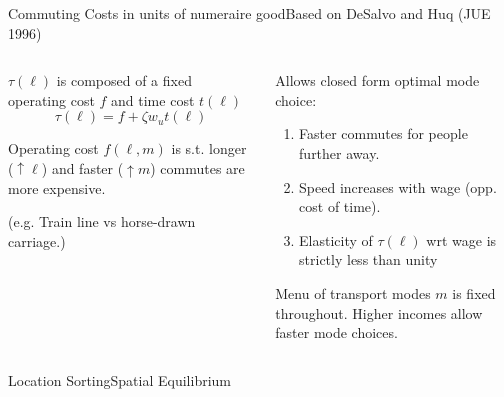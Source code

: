 \documentclass[aspectratio=169]{beamer}
\begin{document}
\begin{v75mins}
\begin{frame}{Commuting Costs in units of numeraire good}{Based on DeSalvo and Huq (JUE 1996)}

\begin{columns}
\begin{column}{0.5\textwidth}
\begin{midi}
\item $\tau(\ell)$ is composed of a fixed operating cost $f$ and time cost $t(\ell)$
\begin{equation*}
\tau(\ell) = f + \zeta w_u t(\ell)
\end{equation*}
\item Operating cost $f(\ell,m)$ is s.t. longer ($\uparrow \ell$) and faster ($\uparrow m$) commutes are more expensive.
\item (e.g. Train line vs horse-drawn carriage.)
\end{midi}
\end{column}
\pause
\begin{column}{0.5\textwidth}
\begin{midi}
\item Allows closed form optimal mode choice:
\begin{enumerate}
\item Faster commutes for people further away.
\item Speed increases with wage (opp. cost of time).
\item Elasticity of $\tau(\ell)$ wrt wage is strictly less than unity%
\end{enumerate}
\item Menu of transport modes $m$ is fixed throughout. Higher incomes allow faster mode choices.
\end{midi}

\end{column}
\end{columns}

\end{frame}



\begin{frame}{Location Sorting}{Spatial Equilibrium}


\end{frame}
\end{v75mins}
\end{document}
